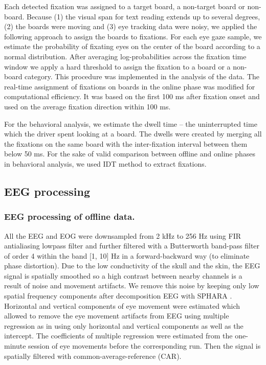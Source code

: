 \documentclass[12pt]{iopart}
\begin{document}
Each detected fixation was assigned to a target board, a non-target board or non-board.
Because (1) the visual span for text reading extends up to several degrees, 
(2) the boards were moving and (3) eye tracking data were noisy,
we applied the following approach to assign the boards
to fixations. For each eye gaze sample, we estimate the probability of
fixating eyes on the center of the board according to a normal distribution.
After averaging log-probabilities across the fixation time window we apply a hard
threshold to assign the fixation to a board or a non-board category.
This procedure was implemented in the analysis of the data.
The real-time assignment of fixations on boards in the online phase was
modified for computational efficiency. It was based
on the first 100 ms after fixation onset and
used on the average fixation direction within 100 ms.

For the behavioral analysis, we estimate 
the dwell time -- the uninterrupted time which the driver spent looking at a board.
The dwells were created
by merging all the fixations on the same board with the inter-fixation interval 
between them below 50 ms.
For the sake of valid comparison between offline and online phases 
in behavioral analysis, we used IDT method to extract fixations.



\subsection{EEG processing}
\subsubsection*{EEG processing of offline data.}
All the EEG and EOG were downsampled from 2 kHz to 256 Hz
using FIR antialiasing lowpass filter
and further filtered  with a Butterworth band-pass filter
of order 4 within the band [1, 10] Hz  in a forward-backward way (to eliminate phase distortion).
Due to the low conductivity of the skull and the skin,
the EEG signal is spatially smoothed so a high contrast between nearby channels
is a result of noise and movement artifacts. We remove this noise
by keeping only low spatial frequency components after decomposition EEG with SPHARA \cite{graichen_sphara_2015}.
Horizontal and vertical components of eye movement were estimated which allowed
to remove the eye movement artifacts from EEG using multiple regression 
as in \cite{schlogl_fully_2007} using only horizontal and vertical 
components as well as the intercept.
The coefficients of multiple regression were estimated from the 
one-minute session of eye movements before the corresponding run.
Then the signal is spatially
filtered with common-average-reference (CAR). 
\end{document}
